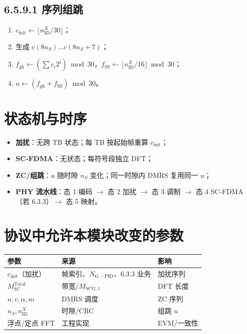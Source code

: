 \documentclass[11pt,a4paper]{ctexart}
\newcommand{\NGPID}{N_{\mathrm{G-PID}}}
\begin{document}
\subsection{6.5.9.1 序列组跳}

\begin{enumerate}
  \item $c_{\mathrm{init}} \leftarrow \lfloor n_{\mathrm{ID}}^{X}/30\rfloor$；
  \item 生成 $c(8n_S)\ldots c(8n_S+7)$；
  \item $f_{\mathrm{gh}} \leftarrow (\sum c_i 2^i)\bmod 30$，$f_{\mathrm{SS}} \leftarrow \lfloor n_{\mathrm{ID}}^{X}/16\rfloor \bmod 30$；
  \item $u \leftarrow (f_{\mathrm{gh}}+f_{\mathrm{SS}})\bmod 30$。
\end{enumerate}

\section{状态机与时序}

\begin{itemize}[nosep]
  \item \textbf{加扰}：无跨 TB 状态；每 TB 按起始帧重算 $c_{\mathrm{init}}$；
  \item \textbf{SC-FDMA}：无状态；每符号段独立 DFT；
  \item \textbf{ZC/组跳}：$u$ 随时隙 $n_S$ 变化；同一时隙内 DMRS 复用同一 $u$；
  \item \textbf{PHY 流水线}：态 1 编码 $\rightarrow$ 态 2 加扰 $\rightarrow$ 态 3 调制 $\rightarrow$ 态 4 SC-FDMA（若 6.3.3）$\rightarrow$ 态 5 映射。
\end{itemize}

\section{协议中允许本模块改变的参数}

\begin{table}[h]
\centering
\small
\begin{tabular}{lll}
\toprule
\textbf{参数} & \textbf{来源} & \textbf{影响} \\
\midrule
$c_{\mathrm{init}}$（加扰） & 帧索引、$\NGPID$、6.3.3 业务 & 加扰序列 \\
$M_{\mathrm{SC}}^{\mathrm{Total}}$ & 带宽/$M_{\mathrm{SCG},1}$ & DFT 长度 \\
$u,v,\alpha,m$ & DMRS 调度 & ZC 序列 \\
$n_S,n_{\mathrm{ID}}^{X}$ & 时隙/CRC & 组跳 $u$ \\
浮点/定点 FFT & 工程实现 & EVM/一致性 \\
\bottomrule
\end{tabular}
\end{table}
\end{document}
